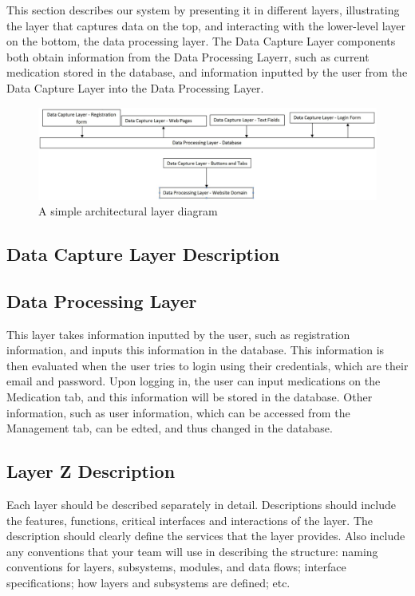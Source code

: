 This section describes our system by presenting it in different layers, illustrating the layer that captures data on the top, and interacting with the lower-level layer on the bottom, the data processing layer. The Data Capture Layer components both obtain information from the Data Processing Layerr, such as current medication stored in the database, and information inputted by the user from the Data Capture Layer into the Data Processing Layer.  

\begin{figure}[h!]
	\centering
 	\includegraphics[width=1\textwidth]{images/LayerBlockDiagram2}
 \caption{A simple architectural layer diagram}
\end{figure}

\subsection{Data Capture Layer Description}
 

\subsection{Data Processing Layer}
This layer takes information inputted by the user, such as registration information, and inputs this information in the database. This information is then evaluated when the user tries to login using their credentials, which are their email and password. Upon logging in, the user can input medications on the Medication tab, and this information will be stored in the database. Other information, such as user information, which can be accessed from the Management tab, can be edted, and thus changed in the database. 

\subsection{Layer Z Description}
Each layer should be described separately in detail. Descriptions should include the features, functions, critical interfaces and interactions of the layer. The description should clearly define the services that the layer provides. Also include any conventions that your team will use in describing the structure: naming conventions for layers, subsystems, modules, and data flows; interface specifications; how layers and subsystems are defined; etc. 